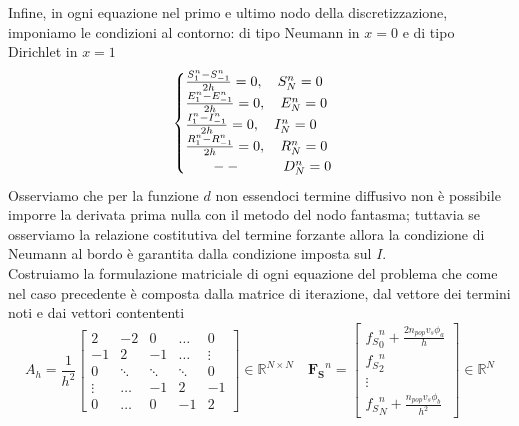 \documentclass[11pt]{article}
\newcommand{\R}{\mathbb{R}}
\begin{document}
Infine, in ogni equazione nel primo e ultimo nodo della discretizzazione, imponiamo le condizioni al contorno: di tipo Neumann in \(x=0\) e di tipo Dirichlet in \(x=1\)
\begin{equation*}
\begin{cases}
\frac{S_1^n-S_{-1}^n}{2h}=0, \quad S_N^n=0 \\
\frac{E_1^n-E_{-1}^n}{2h}=0, \quad E_N^n=0 \\
\frac{I_1^n-I_{-1}^n}{2h}=0, \quad I_N^n=0 \\
\frac{R_1^n-R_{-1}^n}{2h}=0, \quad R_N^n=0 \\
\hspace{0.7cm}--\hspace{0.7cm} \quad D_N^n=0 \\
\end{cases}
\end{equation*}
Osserviamo che per la funzione \(d\) non essendoci termine diffusivo non è possibile imporre la derivata prima nulla con il metodo del nodo fantasma; tuttavia se osserviamo la relazione costitutiva del termine forzante allora la condizione di Neumann al bordo è garantita dalla condizione imposta sul \(I\). \\  
Costruiamo la formulazione matriciale di ogni equazione del problema che come nel caso precedente è composta dalla matrice di iterazione, dal vettore dei termini noti e dai vettori contententi 
\begin{equation*}
A_h= \frac{1}{h^2} \begin{bmatrix}
2 & -2 & 0 & \dots & 0 \\
-1 & 2 & -1 & \dots & \vdots\\
0 & \ddots & \ddots & \ddots & 0 \\
\vdots& \dots & -1& 2& -1 \\
0 & \dots & 0& -1 & 2
\end{bmatrix} \in \R^{N \times N} 
\quad
\mathbf{F_S}^n = \begin{bmatrix} {f_S}_0^n + \frac{2 n_{pop} v_s \phi_a}{h}\\ {f_S}_2^n \\ \vdots \\ {f_S}_N^n + \frac{n_{pop} v_s \phi_b}{h^2} \end{bmatrix} \in \R^N 
\end{equation*}
\end{document}
